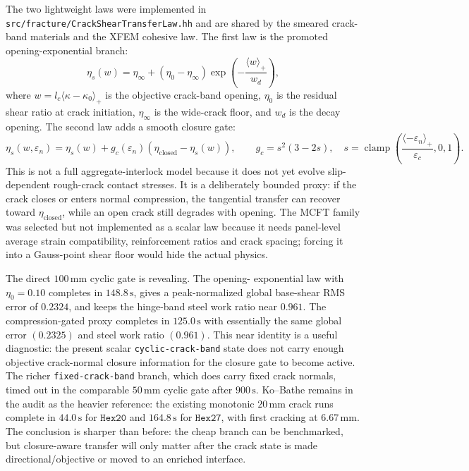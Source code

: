 The two lightweight laws were implemented in
\texttt{src/fracture/CrackShearTransferLaw.hh} and are shared by the smeared
crack-band materials and the XFEM cohesive law. The first law is the promoted
opening-exponential branch:
\[
  \eta_s(w)=\eta_\infty+
  \left(\eta_0-\eta_\infty\right)
  \exp\!\left(-\frac{\langle w\rangle_+}{w_d}\right),
\]
where \(w=l_c\langle\kappa-\kappa_0\rangle_+\) is the objective crack-band
opening, \(\eta_0\) is the residual shear ratio at crack initiation,
\(\eta_\infty\) is the wide-crack floor, and \(w_d\) is the decay opening.
The second law adds a smooth closure gate:
\[
  \eta_s(w,\varepsilon_n)=
  \eta_s(w) + g_c(\varepsilon_n)
  \left(\eta_{\mathrm{closed}}-\eta_s(w)\right),
  \qquad
  g_c=s^2(3-2s),\quad
  s=\operatorname{clamp}\!\left(
    \frac{\langle-\varepsilon_n\rangle_+}{\varepsilon_c},0,1\right).
\]
This is not a full aggregate-interlock model because it does not yet evolve
slip-dependent rough-crack contact stresses. It is a deliberately bounded
proxy: if the crack closes or enters normal compression, the tangential
transfer can recover toward \(\eta_{\mathrm{closed}}\), while an open crack
still degrades with opening. The MCFT family was selected but not implemented
as a scalar law because it needs panel-level average strain compatibility,
reinforcement ratios and crack spacing; forcing it into a Gauss-point shear
floor would hide the actual physics.

The direct \(100\,\mathrm{mm}\) cyclic gate is revealing. The opening-
exponential law with \(\eta_0=0.10\) completes in \(148.8\,\mathrm{s}\), gives
a peak-normalized global base-shear RMS error of \(0.2324\), and keeps the
hinge-band steel work ratio near \(0.961\). The compression-gated proxy
completes in \(125.0\,\mathrm{s}\) with essentially the same global error
\((0.2325)\) and steel work ratio \((0.961)\). This near identity is a useful
diagnostic: the present scalar \texttt{cyclic-crack-band} state does not carry
enough objective crack-normal closure information for the closure gate to
become active. The richer \texttt{fixed-crack-band} branch, which does carry
fixed crack normals, timed out in the comparable \(50\,\mathrm{mm}\) cyclic
gate after \(900\,\mathrm{s}\). Ko--Bathe remains in the audit as the heavier
reference: the existing monotonic \(20\,\mathrm{mm}\) crack runs complete in
\(44.0\,\mathrm{s}\) for \(\texttt{Hex20}\) and \(164.8\,\mathrm{s}\) for
\(\texttt{Hex27}\), with first cracking at \(6.67\,\mathrm{mm}\). The conclusion
is sharper than before: the cheap branch can be benchmarked, but closure-aware
transfer will only matter after the crack state is made directional/objective
or moved to an enriched interface.


